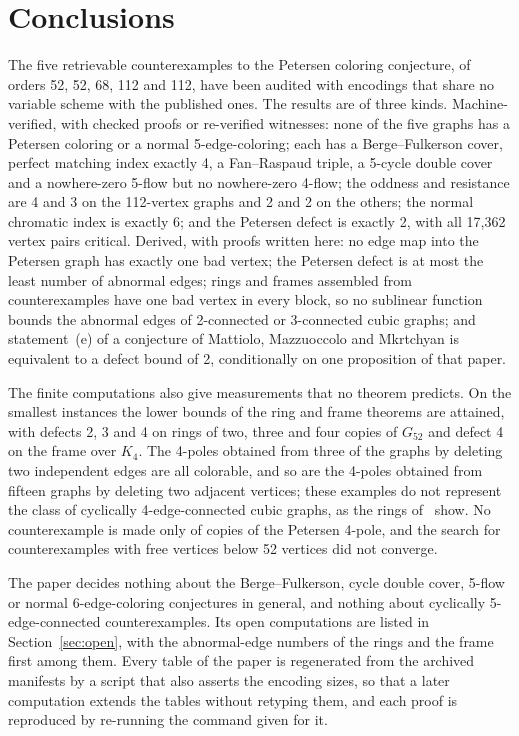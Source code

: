 \documentclass[11pt]{article}
\theoremstyle{definition}
\theoremstyle{remark}
\newcommand{\Gfty}{G_{52}}
\begin{document}
\section{Conclusions}\label{sec:conclusions}

The five retrievable counterexamples to the Petersen coloring conjecture, of orders 52, 52, 68, 112 and 112,
have been audited with encodings that share no variable scheme with the published ones. The results
are of three kinds. Machine-verified, with checked proofs or re-verified witnesses: none of the five
graphs has a Petersen coloring or a normal 5-edge-coloring; each has a Berge--Fulkerson cover, perfect
matching index exactly 4, a Fan--Raspaud triple, a 5-cycle double cover and a nowhere-zero 5-flow but no
nowhere-zero 4-flow; the oddness and resistance are 4 and 3 on the 112-vertex graphs and 2 and 2 on the
others; the normal chromatic index is exactly 6; and the Petersen defect is exactly 2, with all 17{,}362
vertex pairs critical. Derived, with proofs written here: no edge map into the Petersen graph has
exactly one bad vertex; the Petersen defect is at most the least number of abnormal edges; rings and
frames assembled from counterexamples have one bad vertex in every block, so no sublinear function
bounds the abnormal edges of 2-connected or 3-connected cubic graphs; and statement~(e) of a conjecture
of Mattiolo, Mazzuoccolo and Mkrtchyan is equivalent to a defect bound of 2, conditionally on one
proposition of that paper.

The finite computations also give measurements that no theorem predicts. On the smallest instances the
lower bounds of the ring and frame theorems are attained, with defects 2, 3 and 4 on rings of two, three
and four copies of $\Gfty$ and defect 4 on the frame over $K_4$. The 4-poles obtained from three of the
graphs by deleting two independent edges are all colorable, and so are the 4-poles obtained from fifteen
graphs by deleting two adjacent vertices; these examples do not represent the class of cyclically
4-edge-connected cubic graphs, as the rings of~\cite{UD2026} show. No counterexample is made only of
copies of the Petersen 4-pole, and the search for counterexamples with free vertices below 52 vertices
did not converge.

The paper decides nothing about the Berge--Fulkerson, cycle double cover, 5-flow or normal
6-edge-coloring conjectures in general, and nothing about cyclically 5-edge-connected counterexamples.
Its open computations are listed in Section~\ref{sec:open}, with the abnormal-edge numbers of the rings
and the frame first among them. Every table of the paper is regenerated from the archived manifests by a
script that also asserts the encoding sizes, so that a later computation extends the tables without
retyping them, and each proof is reproduced by re-running the command given for it.
\end{document}
